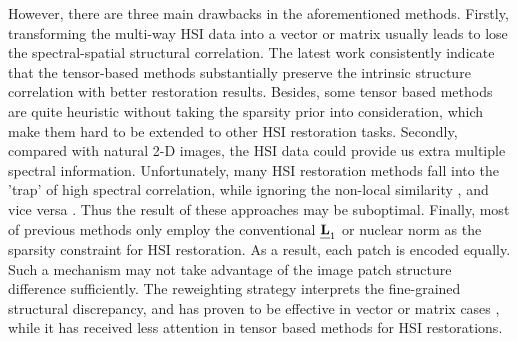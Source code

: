 \documentclass[twocolumn]{svjour3}          %
\begin{document}
  However, there are three main drawbacks in the aforementioned methods. Firstly, transforming the multi-way HSI data into a vector or matrix usually leads to lose the spectral-spatial structural correlation. The latest work \cite{xie2016multispectral, dian2017hyperspectral} consistently indicate that the tensor-based methods substantially preserve the intrinsic structure correlation with better restoration results. Besides, some tensor based methods are quite heuristic without taking the sparsity prior into consideration, which make them hard to be extended to other HSI restoration tasks. Secondly, compared with natural 2-D images, the HSI data could provide us extra multiple spectral information. Unfortunately, many HSI restoration methods fall into the 'trap' of high spectral correlation, while ignoring the non-local similarity \cite{he2016total}, and vice versa \cite{dian2017hyperspectral}. Thus the result of these approaches may be suboptimal. Finally, most of previous methods only employ the conventional $\textbf{\emph{L}}_1$ or nuclear norm as the sparsity constraint for HSI restoration. As a result, each patch is encoded equally. Such a mechanism may not take advantage of the image patch structure difference sufficiently. The reweighting strategy interprets the fine-grained structural discrepancy, and has proven to be effective in vector or matrix cases \cite{candes2008enhancing, liu2016truncated, Gu2014Weighted, Yan2013Nonlocal}, while it has received less attention in tensor based methods for HSI restorations.
\end{document}
